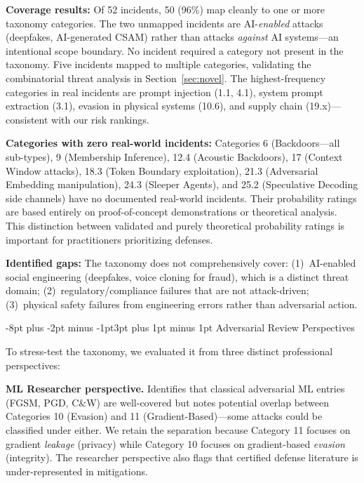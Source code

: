 \documentclass[conference]{IEEEtran}
\makeatletter
\renewcommand{\subsection}{\@startsection{subsection}{2}{\z@}%
  {-8pt plus -2pt minus -1pt}{3pt plus 1pt minus 1pt}%
  {\normalfont\normalsize\bfseries\sffamily\color{accentblue}}}
\makeatother
\begin{document}
\textbf{Coverage results:} Of 52 incidents, 50 (96\%) map cleanly to one or more taxonomy categories. The two unmapped incidents are AI-\emph{enabled} attacks (deepfakes, AI-generated CSAM) rather than attacks \emph{against} AI systems---an intentional scope boundary. No incident required a category not present in the taxonomy. Five incidents mapped to multiple categories, validating the combinatorial threat analysis in Section~\ref{sec:novel}. The highest-frequency categories in real incidents are prompt injection (1.1, 4.1), system prompt extraction (3.1), evasion in physical systems (10.6), and supply chain (19.x)---consistent with our risk rankings.

\textbf{Categories with zero real-world incidents:} Categories 6 (Backdoors---all sub-types), 9 (Membership Inference), 12.4 (Acoustic Backdoors), 17 (Context Window attacks), 18.3 (Token Boundary exploitation), 21.3 (Adversarial Embedding manipulation), 24.3 (Sleeper Agents), and 25.2 (Speculative Decoding side channels) have no documented real-world incidents. Their probability ratings are based entirely on proof-of-concept demonstrations or theoretical analysis. This distinction between validated and purely theoretical probability ratings is important for practitioners prioritizing defenses.

\textbf{Identified gaps:} The taxonomy does not comprehensively cover: (1)~AI-enabled social engineering (deepfakes, voice cloning for fraud), which is a distinct threat domain; (2)~regulatory/compliance failures that are not attack-driven; (3)~physical safety failures from engineering errors rather than adversarial action.

\subsection{Adversarial Review Perspectives}\label{sec:adversarial_review}

To stress-test the taxonomy, we evaluated it from three distinct professional perspectives:

\textbf{ML Researcher perspective.} Identifies that classical adversarial ML entries (FGSM, PGD, C\&W) are well-covered but notes potential overlap between Categories 10 (Evasion) and 11 (Gradient-Based)---some attacks could be classified under either. We retain the separation because Category 11 focuses on gradient \emph{leakage} (privacy) while Category 10 focuses on gradient-based \emph{evasion} (integrity). The researcher perspective also flags that certified defense literature is under-represented in mitigations.
\end{document}
